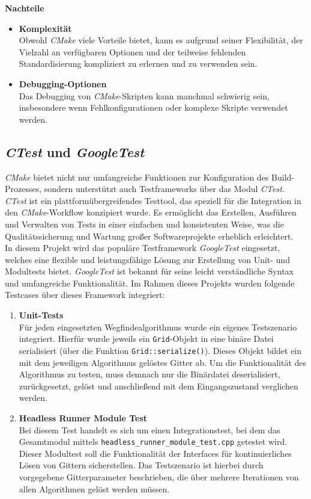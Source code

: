 \newpage
\textbf{Nachteile}
\begin{itemize}
    \item \textbf{Komplexität}\\
    Obwohl \textit{CMake} viele Vorteile bietet, kann es aufgrund seiner Flexibilität, der Vielzahl an verfügbaren Optionen und der teilweise fehlenden Standardisierung kompliziert zu erlernen und zu verwenden sein.
    \item \textbf{Debugging-Optionen}\\
    Das Debugging von \textit{CMake}-Skripten kann manchmal schwierig sein, insbesondere wenn Fehlkonfigurationen oder komplexe Skripte verwendet werden.
\end{itemize}

\subsection{\textit{CTest} und \textit{GoogleTest}}
\label{subsec:ctest-integration}
\textit{CMake} bietet nicht nur umfangreiche Funktionen zur Konfiguration des Build-Prozesses, sondern unterstützt auch Testframeworks über das Modul \textit{CTest}.
\textit{CTest} ist ein plattformübergreifendes Testtool, das speziell für die Integration in den \textit{CMake}-Workflow konzipiert wurde.
Es ermöglicht das Erstellen, Ausführen und Verwalten von Tests in einer einfachen und konsistenten Weise, was die Qualitätssicherung und Wartung großer Softwareprojekte erheblich erleichtert.\\
In diesem Projekt wird das populäre Testframework \textit{GoogleTest} eingesetzt, welches eine flexible und leistungsfähige Lösung zur Erstellung von Unit- und Modultests bietet.
\textit{GoogleTest} ist bekannt für seine leicht verständliche Syntax und umfangreiche Funktionalität. \cite{Cmake2024, GTest2024}
Im Rahmen dieses Projekts wurden folgende Testcases über dieses Framework integriert:
\begin{enumerate}
    \item \textbf{Unit-Tests}\\
    Für jeden eingesetzten Wegfindealgorithmus wurde ein eigenes Testszenario integriert.
    Hierfür wurde jeweils ein \texttt{Grid}-Objekt in eine binäre Datei serialisiert (über die Funktion \texttt{Grid::serialize()}).
    Dieses Objekt bildet ein mit dem jeweiligen Algorithmus gelöstes Gitter ab.
    Um die Funktionalität des Algorithmus zu testen, muss demnach nur die Binärdatei deserialisiert, zurückgesetzt, gelöst und anschließend mit dem Eingangszustand verglichen werden.
    \item \textbf{Headless Runner Module Test}\\
    Bei diesem Test handelt es sich um einen Integrationstest, bei dem das Gesamtmodul mittels \texttt{headless\_runner\_module\_test.cpp} getestet wird.
    Dieser Modultest soll die Funktionalität der Interfaces für kontinuierliches Lösen von Gittern sicherstellen.
    Das Testszenario ist hierbei durch vorgegebene Gitterparameter beschrieben, die über mehrere Iterationen von allen Algorithmen gelöst werden müssen.
\end{enumerate}
